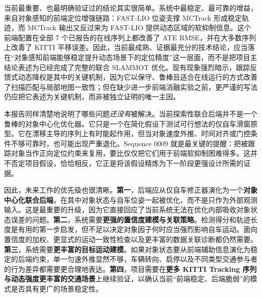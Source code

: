\documentclass[utf8, a4paper, 12pt]{ctexart}
\begin{document}
当前最重要、也最明确验证过的结论其实很简单。系统中最稳定、最可靠的增益，来自对象感知的前端定位增强链路：FAST-LIO 位姿支撑 MCTrack 形成稳定轨迹，而 MCTrack 输出又反过来为 FAST-LIO 提供动态区域的软抑制信息。这个前端配置在全部 7 个已报告的在线序列上都改善了 ATE RMSE，并在大多数序列上改善了 KITTI 平移误差。因此，当前最成熟、证据最充分的技术结论，应当落在“对象感知前端能够稳定提升动态场景下的定位精度”这一层面，而不是把项目主结论表述为已经完成了完整的联合 SLAMMOT 优化。现有现象强烈暗示，跟踪反馈式动态降权是其中的关键机制，因为它以保守、鲁棒且适合在线运行的方式改善了扫描匹配与局部地图一致性；但在缺少进一步前端消融实验之前，更严谨的写法仍应把它表述为关键机制，而非被独立证明的唯一主因。

本报告同样清楚地说明了哪些问题\emph{还没有}被解决。当前探索性联合后端并不是一个鲁棒的对象中心化优化器。它只是一个在简化假设下测试可行想法的仅自车滑窗原型。它在漂移主导的序列上有时能起作用，但当对象速度外推、时间对齐或门控条件不够可靠时，也可能出现严重退化。Sequence 0009 就是最关键的提醒：把被跟踪对象当作正向定位约束来复用，要比仅仅把它们用于前端软抑制困难得多。这并不否定项目假设，恰恰相反，它正是将该假设精炼为下一阶段更强设计所需的证据。

因此，未来工作的优先级也很清晰。\textbf{第一}，后端应从仅自车修正器演化为一个\textbf{对象中心化联合后端}，在其中对象状态与自车位姿一起被优化，而不是只作为外部观测输入。这是最重要的升级，因为它直接回应了当前系统无法在优化内部吸收对象状态误差的问题。\textbf{第二}，系统需要\textbf{更强的置信度建模与关联策略}。检测得分和轨迹长度是有用的第一步启发，但不足以决定对象因子何时应当强烈影响自车运动。面向置信度的加权、更显式的运动一致性检查以及更丰富的数据关联诊断都仍然需要。\textbf{第三}，系统需要\textbf{更丰富的目标运动建模}。如果对象状态要从前端辅助信息演化为稳定的后端约束，单一匀速外推显然不够，车辆转向、启停以及不同类型交通参与者的行为差异都需要更合理地表达。\textbf{第四}，项目需要在\textbf{更多 KITTI Tracking 序列与动态强度更丰富的交通场景}上继续验证，以确认当前“前端稳定、后端脆弱”的模式是否具有更广的场景稳定性。
\end{document}
